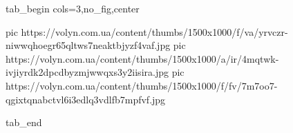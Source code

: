  
 
 
 
 


\ifcmt
  tab_begin cols=3,no_fig,center

     pic https://volyn.com.ua/content/thumbs/1500x1000/f/va/yrvczr-niwwqhoegr65qltws7neaktbjyzf4vaf.jpg
		 pic https://volyn.com.ua/content/thumbs/1500x1000/a/ir/4mqtwk-ivjiyrdk2dpcdbyzmjwwqxs3y2iisira.jpg
		 pic https://volyn.com.ua/content/thumbs/1500x1000/f/fv/7m7oo7-qgixtqnabctvl6i3edlq3vdlfb7mpfvf.jpg

  tab_end
\fi
